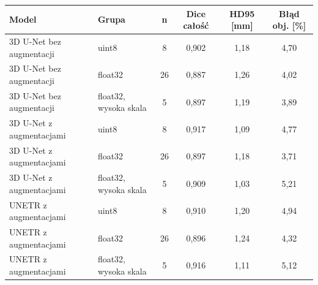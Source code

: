 \begin{tabular}{llcccc}
\hline
Model & Grupa & n & Dice całość & HD95 [mm] & Błąd obj. [\%] \\ \hline
3D U-Net bez augmentacji & uint8 & 8 & 0,902 & 1,18 & 4,70 \\
3D U-Net bez augmentacji & float32 & 26 & 0,887 & 1,26 & 4,02 \\
3D U-Net bez augmentacji & float32, wysoka skala & 5 & 0,897 & 1,19 & 3,89 \\
3D U-Net z augmentacjami & uint8 & 8 & 0,917 & 1,09 & 4,77 \\
3D U-Net z augmentacjami & float32 & 26 & 0,897 & 1,18 & 3,71 \\
3D U-Net z augmentacjami & float32, wysoka skala & 5 & 0,909 & 1,03 & 5,21 \\
UNETR z augmentacjami & uint8 & 8 & 0,910 & 1,20 & 4,94 \\
UNETR z augmentacjami & float32 & 26 & 0,896 & 1,24 & 4,32 \\
UNETR z augmentacjami & float32, wysoka skala & 5 & 0,916 & 1,11 & 5,12 \\
\hline
\end{tabular}